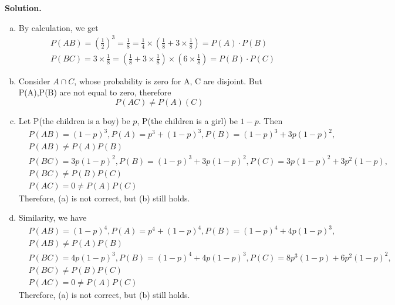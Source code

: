 \documentclass{article}
\begin{document}
{\bf Solution.}
\begin{enumerate}[(a)]
    \item By calculation, we get
    $$ 
    \begin{align*}
        &P(AB)=\left(\frac{1}{2}\right)^3 = \frac{1}{8}=\frac{1}{4}\times (\frac{1}{8}+3\times \frac{1}{8})= P(A)\cdot P(B) \\
        &P(BC)=3\times \frac{1}{8}=(\frac{1}{8}+3\times\frac{1}{8})\times (6 \times \frac{1}{8}) = P(B)\cdot P(C) 
    \end{align*}
    $$
    \item Consider $A\cap C$, whose probability is zero for A, C are disjoint. But P(A),P(B) are not equal to zero, therefore 
    $$ P(AC)\neq P(A)(C)$$
    \item Let P(the children is a boy) be $p$, P(the children is a girl) be $1-p$. Then 
    $$
    \begin{align*}
    &P(AB)=(1-p)^3,P(A)=p^3+(1-p)^3,P(B)=(1-p)^3+3p(1-p)^2,\\
    &P(AB)\neq P(A)P(B)\\
    &P(BC)=3p(1-p)^2,P(B)=(1-p)^3+3p(1-p)^2,P(C)=3p(1-p)^2+3p^2(1-p),\\
    &P(BC)\neq P(B)P(C)\\
    &P(AC)=0\neq P(A)P(C)
    \end{align*}
    $$
    Therefore, (a) is not correct, but (b) still holds.
    \item Similarity, we have 
    $$ 
    \begin{align*}
        & P(AB)=(1-p)^4, P(A)=p^4+(1-p)^4, P(B)= (1-p)^4+4p(1-p)^3,\\
        &P(AB)\neq P(A)P(B)\\
        & P(BC)=4p(1-p)^3,P(B)=(1-p)^4+4p(1-p)^3,P(C)=8p^3(1-p)+6p^2(1-p)^2,\\
        & P(BC)\neq P(B)P(C)\\
        & P(AC)=0\neq P(A)P(C)
    \end{align*}
    $$
    Therefore, (a) is not correct, but (b) still holds.
\end{enumerate}
\end{document}
